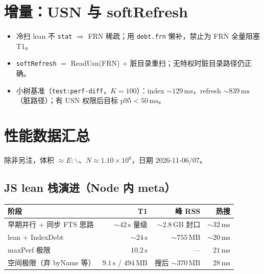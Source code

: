 \documentclass[UTF8,a4paper,11pt]{ctexart}
\begin{document}
\section{增量：USN 与 softRefresh}

\begin{itemize}[leftmargin=1.6em]
  \item 冷扫 lean 不 \texttt{stat} $\Rightarrow$ FRN 稀疏；用 \texttt{debt.frn} 懒补，禁止为 FRN 全量阻塞 T1。
  \item \texttt{softRefresh} $=$ ReadUsn(FRN) + 脏目录重扫；无特权时脏目录路径仍正确。
  \item 小树基准（\texttt{test:perf-diff}，$K=100$）：index $\sim 129\,\mathrm{ms}$，refresh $\sim 839\,\mathrm{ms}$（脏路径）；有 USN 权限后目标 p95$<50\,\mathrm{ms}$。
\end{itemize}

\section{性能数据汇总}
\label{sec:perf-indexd}

除非另注，体积 $\approx E{:}\backslash$、$N\approx 1.10\times 10^6$，日期 2026-11-06/07。

\subsection{JS lean 栈演进（Node 内 meta）}
\begin{center}
\begin{tabular}{@{}lrrr@{}}
\toprule
阶段 & T1 & 峰 RSS & 热搜 \\
\midrule
早期并行 + 同步 FTS 思路 & $\sim 42\,\mathrm{s}$ 量级 & $\sim 2.8\,\mathrm{GB}$ 封口 & $\sim 32\,\mathrm{ms}$ \\
lean + IndexDebt & $\sim 24\,\mathrm{s}$ & $\sim 755\,\mathrm{MB}$ & $\sim 20\,\mathrm{ms}$ \\
maxPerf 极限 & $10.2\,\mathrm{s}$ & — & $21\,\mathrm{ms}$ \\
空间极限（弃 byName 等） & $9.1\,\mathrm{s}$ / $494\,\mathrm{MB}$ & 搜后 $\sim 370\,\mathrm{MB}$ & $28\,\mathrm{ms}$ \\
\bottomrule
\end{tabular}
\end{center}
\end{document}
